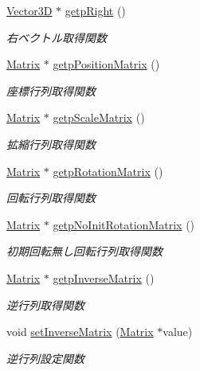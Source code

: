\begin{DoxyCompactItemize}
\mbox{\hyperlink{class_vector3_d}{Vector3D}} $\ast$ \mbox{\hyperlink{class_transform_a636334048ae8fb50455ec8fd290668d6}{getp\+Right}} ()
\begin{DoxyCompactList}\small\item\em 右ベクトル取得関数 \end{DoxyCompactList}\item 
\mbox{\hyperlink{class_matrix}{Matrix}} $\ast$ \mbox{\hyperlink{class_transform_a825ad9edaf799a83076cbb9f78852649}{getp\+Position\+Matrix}} ()
\begin{DoxyCompactList}\small\item\em 座標行列取得関数 \end{DoxyCompactList}\item 
\mbox{\hyperlink{class_matrix}{Matrix}} $\ast$ \mbox{\hyperlink{class_transform_ad7b44f1e97d83f2f810e231bae2de2b5}{getp\+Scale\+Matrix}} ()
\begin{DoxyCompactList}\small\item\em 拡縮行列取得関数 \end{DoxyCompactList}\item 
\mbox{\hyperlink{class_matrix}{Matrix}} $\ast$ \mbox{\hyperlink{class_transform_af0ea9094ccda77809978208614772447}{getp\+Rotation\+Matrix}} ()
\begin{DoxyCompactList}\small\item\em 回転行列取得関数 \end{DoxyCompactList}\item 
\mbox{\hyperlink{class_matrix}{Matrix}} $\ast$ \mbox{\hyperlink{class_transform_a5d30e9aa1c2d1fff96996b6368a7f610}{getp\+No\+Init\+Rotation\+Matrix}} ()
\begin{DoxyCompactList}\small\item\em 初期回転無し回転行列取得関数 \end{DoxyCompactList}\item 
\mbox{\hyperlink{class_matrix}{Matrix}} $\ast$ \mbox{\hyperlink{class_transform_af172f4f0dfb057d1ee473d1314787352}{getp\+Inverse\+Matrix}} ()
\begin{DoxyCompactList}\small\item\em 逆行列取得関数 \end{DoxyCompactList}\item 
void \mbox{\hyperlink{class_transform_a78b6b021ca4cc1641f934160befb39dd}{set\+Inverse\+Matrix}} (\mbox{\hyperlink{class_matrix}{Matrix}} $\ast$value)
\begin{DoxyCompactList}\small\item\em 逆行列設定関数 \end{DoxyCompactList}\item 

\end{DoxyCompactItemize}
